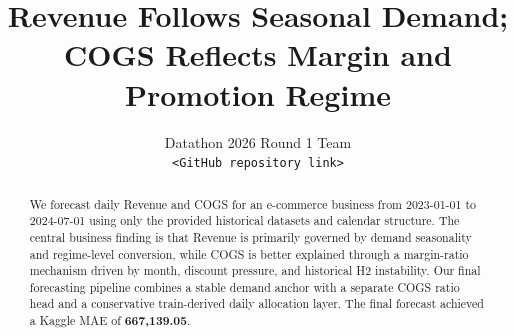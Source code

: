 \documentclass{article}
\title{Revenue Follows Seasonal Demand; COGS Reflects Margin and Promotion Regime}
\author{
Datathon 2026 Round 1 Team \\
\texttt{<GitHub repository link>}
}
\newcommand{\metric}[1]{\textbf{#1}}
\begin{document}
\maketitle

\begin{abstract}
We forecast daily Revenue and COGS for an e-commerce business from 2023-01-01 to 2024-07-01 using only the provided historical datasets and calendar structure. The central business finding is that Revenue is primarily governed by demand seasonality and regime-level conversion, while COGS is better explained through a margin-ratio mechanism driven by month, discount pressure, and historical H2 instability. Our final forecasting pipeline combines a stable demand anchor with a separate COGS ratio head and a conservative train-derived daily allocation layer. The final forecast achieved a Kaggle MAE of \metric{667,139.05}.
\end{abstract}






\clearpage
\appendix

\end{document}
